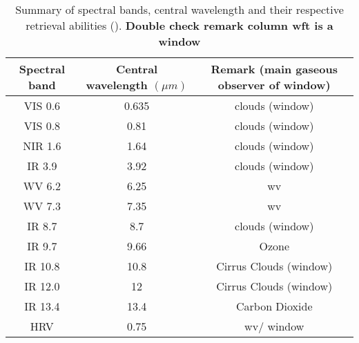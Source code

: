 \begin{table}[ht]
    \centering
    \setlength\extrarowheight{-7pt}
    \begin{tabular}{c|c|c}
        Spectral band & Central wavelength $\left( \mu m  \right)$ & Remark \newline 
        (main gaseous observer of window) \\ \hline
        VIS 0.6 & 0.635 & clouds (window)    \\
        VIS 0.8 & 0.81  & clouds (window)     \\
        NIR 1.6 & 1.64  & clouds (window)    \\
        IR 3.9 & 3.92  & clouds  (window)     \\
        WV 6.2 & 6.25 & \acrlong{wv}  \\
        WV 7.3 & 7.35 & \acrlong{wv}  \\ 
        IR 8.7 & 8.7 &   clouds  (window)       \\
        IR 9.7 & 9.66 & Ozone        \\
        IR 10.8 & 10.8 & Cirrus Clouds (window)  \\
        IR 12.0 & 12 & Cirrus Clouds (window) \\
        IR 13.4 & 13.4 & Carbon Dioxide  \\
        HRV & 0.75 & \acrlong{wv}/ window 
    \end{tabular}
    \caption{Summary of spectral bands, central wavelength and their respective retrieval abilities (\cite{Schmetz_meteosat_intro}). \textbf{Double check remark column wft is a window}}
    \label{tab:msg_spectral_bands}
\end{table}